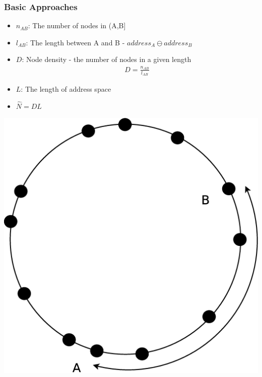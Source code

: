 \documentclass[red]{beamer}
\begin{document}
\begin{frame}
\frametitle{Basic Approaches}
\begin{minipage}{7cm}
\begin{itemize}
\item $n_{AB}$: The number of nodes in (A,B]
\item $l_{AB}$: The length between A and B - $address_A \ominus address_B$
\item $D$: Node density - the number of nodes in a given length
\begin{eqnarray*}
D = \frac{n_{AB}}{l_{AB}}
\end{eqnarray*}
\item $L$: The length of address space 
\item $\hat{N} = DL$
\end{itemize}
\end{minipage}
\begin{minipage}{3cm}
\includegraphics[scale=0.15]{figs/density}
\end{minipage}
\end{frame}
\end{document}
